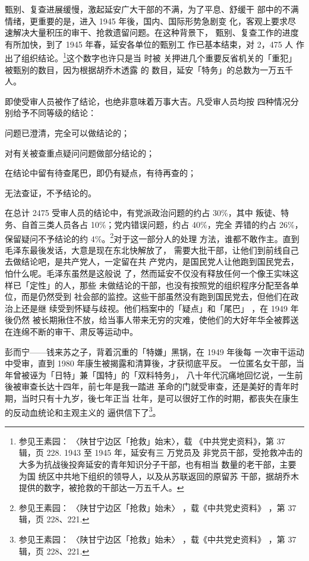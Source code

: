 甄别、复查进展缓慢，激起延安广大干部的不满，为了平息、舒缓干 部中的不满
情绪，更重要的是，进入 1945 年後，国内、国际形势急剧变 化，客观上要求尽
速解决大量积压的审干、抢救遗留问题。在这种背景下， 甄别、复查工作的进度
有所加快，到了 1945 年春，延安各单位的甄别工 作已基本结束，对 2，475 人
作出了组织结论。\footnote{参见王素园： 〈陕甘宁边区「抢救」始末〉，载
《中共党史资料》，第 37 辑，页 228. 1943 至 1945 年，延安有三 万党员及
非党员干部，受抢救冲击的大多为抗战後投奔延安的青年知识分子干部，也有相当
数量的老干部，主要为国 统区中共地下组织的领导人，以及从苏联返回的原留苏
干部，据胡乔木提供的数字，被抢救的干部达一万五千人。}这个数字也许只是当
时被 关押进几个重要反省机关的「重犯」被甄别的数目，因为根据胡乔木透露 的
数目，延安「特务」的总数为一万五千人。

即使受审人员被作了结论，也绝非意味着万事大吉。凡受审人员均按
四种情况分别给予不同等级的结论：

问题已澄清，完全可以做结论的；

对有关被查重点疑问问题做部分结论的；

在结论中留有待查尾巴，即仍有疑点，有待再查的；

无法查证，不予结论的。

在总计 2475 受审人员的结论中，有党派政治问题的约占 30\%，其中
叛徒、特务、自首三类人员各占 10\%；党内错误问题，约占 40\%，完全
弄错的约占 26\%，保留疑问不予结论的约 4\%。\footnote{参见王素园：
〈陕甘宁边区「抢救」始未〉
，载《中共党史资料》
，第 37 辑，页 228、221.}对于这一部分人的处理
方法，谁都不敢作主。直到毛泽东最後发话，大意是现在东北快解放了，
需要大批干部，让他们到前线自己去做结论吧，是共产党人，一定留在共
产党内，是国民党人让他跑到国民党去，怕什么呢。毛泽东虽然是这般说
了，然而延安不仅没有释放任何一个像王实味这样已「定性」的人，那些
未做结论的干部，也没有按照党的组织程序分配至各单位，而是仍然受到
社会部的监控。这些干部虽然没有跑到国民党去，但他们在政治上还是继
续受到怀疑与歧视。他们档案中的「疑点」和「尾巴」
，在 1949 年後仍然
被长期揪住不放，给当事人带来无穷的灾难，使他们的大好年华全被葬送
在连绵不断的审干、肃反等运动中。

彭而宁——钱来苏之子，背着沉重的「特嫌」黑锅，在 1949 年後每
一次审干运动中受审，直到 1980 年康生被揭露和清算後，才获彻底平反。
一位匿名女干部，当年曾被诬为「日特」兼「国特」的「双料特务」，
八十年代沉痛地回忆说，一生前後被审查长达十四年，前七年是我一踏进
革命的门就受审查，还是美好的青年时期，当时只有十九岁，後七年正当
壮年，是可以很好工作的时期，都丧失在康生的反动血统论和主观主义的
逼供信下了\footnote{参见王素园：
〈陕甘宁边区「抢救」始未〉
，载《中共党史资料》
，第 37 辑，页 228、221.}。

